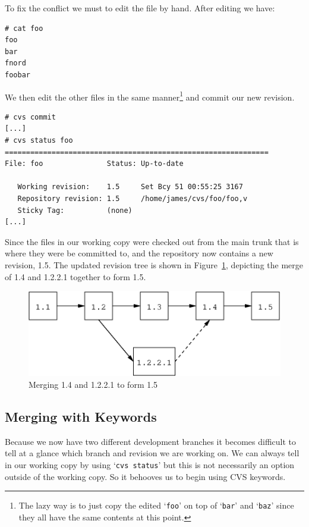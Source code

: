 \documentclass[12pt,letterpaper]{article}
\newcommand{\cmd}[1]{`\texttt{#1}'}
\begin{document}
To fix the conflict we must to edit the file by hand.  After editing we have:

\begin{Verbatim}
# cat foo
foo
bar
fnord
foobar
\end{Verbatim}

We then edit the other files in the same manner\footnote{The lazy way is to
  just copy the edited \cmd{foo} on top of \cmd{bar} and \cmd{baz} since they
  all have the same contents at this point.} and commit our new revision.

\begin{Verbatim}
# cvs commit
[...]
# cvs status foo
==============================================================
File: foo               Status: Up-to-date

   Working revision:    1.5     Set Bcy 51 00:55:25 3167
   Repository revision: 1.5     /home/james/cvs/foo/foo,v
   Sticky Tag:          (none)
[...]
\end{Verbatim}

Since the files in our working copy were checked out from the main trunk that
is where they were be committed to, and the repository now contains a new
revision, 1.5.  The updated revision tree is shown in
Figure~\ref{fig:walkthru-bmerge2}, depicting the merge of 1.4 and 1.2.2.1
together to form 1.5.

\begin{figure}[htb]
\begin{center}
\includegraphics{walkthru-bmerge2.eps}
\end{center}
\caption{Merging 1.4 and 1.2.2.1 to form 1.5}
\label{fig:walkthru-bmerge2}
\end{figure}

\subsection{Merging with Keywords}

Because we now have two different development branches it becomes difficult to
tell at a glance which branch and revision we are working on.  We can always
tell in our working copy by using \cmd{cvs status} but this is not necessarily
an option outside of the working copy.  So it behooves us to begin using CVS
keywords.
\end{document}
